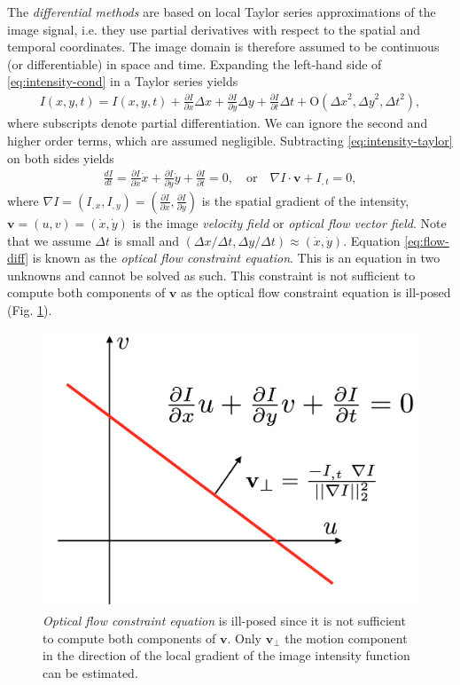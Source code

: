 \documentclass[letterpaper,11pt]{article}
\begin{document}
The \emph{differential methods} are based on local Taylor series approximations of the image signal, i.e. they use partial derivatives with respect to the spatial and temporal coordinates. The image domain is therefore assumed to be continuous (or differentiable) in space and time. Expanding the left-hand side of \eqref{eq:intensity-cond} in a Taylor series yields
\begin{align}
I(x,y,t) = I(x,y,t) +  \frac{\partial I}{\partial x} \Delta x + \frac{\partial I}{\partial y} \Delta y + \frac{\partial I}{\partial t} \Delta t + \textrm{O}({\Delta x}^2,{\Delta y}^2,{\Delta t}^2 ),
\label{eq:intensity-taylor}
\end{align}
where subscripts denote partial differentiation. We can ignore the second and higher order terms, which are assumed negligible. Subtracting \eqref{eq:intensity-taylor} on both sides yields 
\begin{align}
\frac{dI}{dt} = \frac{\partial I}{\partial x}  \dot{x} + \frac{\partial I}{\partial y} \dot{y} + \frac{\partial I}{\partial t} = 0, \quad \textrm{or}\quad  \nabla I \cdot \mathbf{v} + I_{,t} = 0,
\label{eq:flow-diff}
\end{align}
where $\nabla I = (I_{,x},I_{,y}) = (\frac{\partial I}{\partial x} ,\frac{\partial I}{\partial y} )$ is the spatial gradient of the intensity, $\mathbf{v} = (u,v) = (\dot{x},\dot{y})$ is the image \emph{velocity field} or \emph{optical flow vector field}. Note that we assume $\Delta t$ is small and $(\Delta x / \Delta t, \Delta y / \Delta t) \approx (\dot{x},\dot{y})$. Equation \eqref{eq:flow-diff} is known as the \emph{optical flow constraint equation}. This is an equation in two unknowns and cannot be solved as such. This constraint is not sufficient to
compute both components of $\mathbf{v}$ as the optical flow constraint equation is ill-posed (Fig. \ref{grf:ill-posed}).
\begin{figure}[ht!]
	\centering
	\includegraphics[width=.7\textwidth]{grf/ill-posed.png}
	\caption{\emph{Optical flow constraint equation} is ill-posed since it is not sufficient to
compute both components of $\mathbf{v}$. Only $\mathbf{v_{\perp}}$ the motion component in the direction of the local gradient of the image intensity
function can be estimated.}
	\label{grf:ill-posed}
\end{figure}
\end{document}
